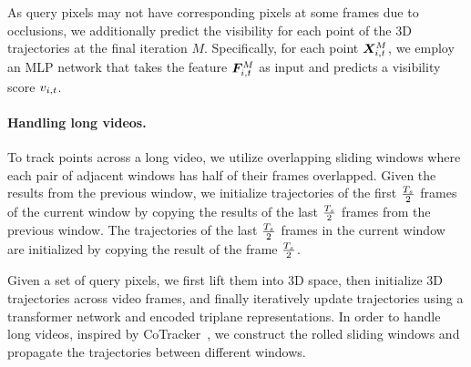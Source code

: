 As query pixels may not have corresponding pixels at some frames due to occlusions, we additionally predict the visibility for each point of the 3D trajectories at the final iteration $M$. Specifically, for each point $\bm{X}_{i,t}^M$, we employ an MLP network that takes the feature $\bm{F}_{i,t}^M$ as input and predicts a visibility score $v_{i,t}$.


\paragraph{Handling long videos.}
To track points across a long video, we utilize overlapping sliding windows where each pair of adjacent windows has half of their frames overlapped.
Given the results from the previous window, we initialize trajectories of the first $\frac{T_s}{2}$ frames of the current window by copying the results of the last $\frac{T_s}{2}$ frames from the previous window.
The trajectories of the last $\frac{T_s}{2}$ frames in the current window are initialized by copying the result of the frame $\frac{T_s}{2}$.



\iffalse
Given a set of query pixels, we first lift them into 3D space, then initialize 3D trajectories across video frames, and finally iteratively update trajectories using a transformer network and encoded triplane representations.
In order to handle long videos, inspired by CoTracker~\cite{cotracker}, we construct the rolled sliding windows and propagate the trajectories between different windows.

